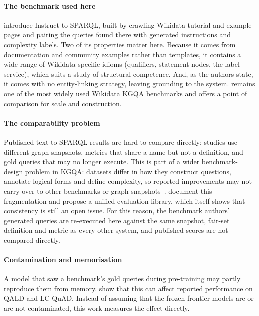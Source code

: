 \paragraph{The benchmark used here}

\citet{benamor2025instruct} introduce Instruct-to-SPARQL, built by crawling Wikidata tutorial and example pages and pairing the queries found there with generated instructions and complexity labels.
Two of its properties matter here.
Because it comes from documentation and community examples rather than templates, it contains a wide range of Wikidata-specific idioms (qualifiers, statement nodes, the label service), which suits a study of structural competence.
And, as the authors state, it comes with no entity-linking strategy, leaving grounding to the system.
\citet{dubey2019lcquad2} remains one of the most widely used Wikidata KGQA benchmarks and offers a point of comparison for scale and construction.

\paragraph{The comparability problem}

Published text-to-SPARQL results are hard to compare directly: studies use different graph snapshots, metrics that share a name but not a definition, and gold queries that may no longer execute.
This is part of a wider benchmark-design problem in KGQA: datasets differ in how they construct questions, annotate logical forms and define complexity, so reported improvements may not carry over to other benchmarks or graph snapshots~\citep{steinmetz2021kgqabenchmarks}.
\citet{taghzouti2026t2smetrics} document this fragmentation and propose a unified evaluation library, which itself shows that consistency is still an open issue.
For this reason, the benchmark authors' generated queries are re-executed here against the same snapshot, fair-set definition and metric as every other system, and published scores are not compared directly.

\paragraph{Contamination and
memorisation}

A model that saw a benchmark's gold queries during pre-training may partly reproduce them from memory.
\citet{gashkov2025memorization} show that this can affect reported performance on QALD and LC-QuAD.
Instead of assuming that the frozen frontier models are or are not contaminated, this work measures the effect directly.

